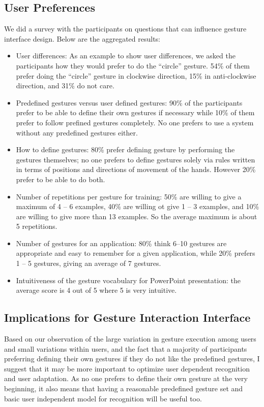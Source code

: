 \subsection{User Preferences}\label{sec:preferences}
We did a survey with the participants on questions that can influence
gesture interface design. Below are the aggregated results:
\begin{itemize}
  \item User differences: As an example to show user differences, we asked
  the participants how they would prefer to do the ``circle'' gesture. 54\%
  of them prefer doing the ``circle'' gesture in clockwise direction, 15\% in
  anti-clockwise direction, and 31\% do not care.
  \item Predefined gestures versus user defined gestures: 90\%
  of the participants prefer to be able to define their own gestures if necessary while 10\% of them prefer to follow prefined
  gestures completely. No one prefers to use a system without any predefined
  gestures either.
  \item How to define gestures: 80\% prefer defining gesture by 
  performing the gestures themselves; no one prefers to
  define gestures solely via rules written in terms of positions and directions
  of movement of the hands.
  However 20\% prefer to be able to do both.
  \item Number of repetitions per gesture for training: 50\% are willing to give a
  maximum of 4 -- 6 examples, 40\% are willing ot give 1 -- 3 examples, and 10\%
  are willing to give more than 13 examples. So the average maximum is about 5
  repetitions.
  \item Number of gestures for an application: 80\% think 6--10 gestures are
  appropriate and easy to remember for a given application, while 20\% prefers 1
  -- 5 gestures, giving an average of 7 gestures.
  \item Intuitiveness of the gesture vocabulary for PowerPoint presentation:
  the average score is 4 out of 5 where 5 is very intuitive.
\end{itemize}

\subsection{Implications for Gesture Interaction Interface}
Based on our observation of the large variation in gesture execution among
users and small variations within users, and the fact that a majority of
participants preferring defining their own gestures if they do not like the
predefined gestures, I suggest that it may be more important to optimize user
dependent recognition and user adaptation. As no one prefers to define their own
gesture at the very beginning, it also means that having a reasonable predefined gesture set and
basic user independent model for recognition will be useful too.

